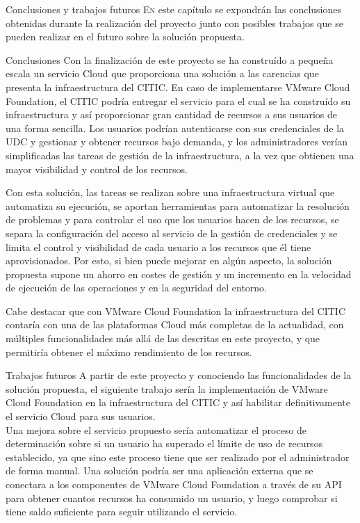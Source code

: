 \begin{chapter}{Conclusiones y trabajos futuros}
    \lettrine{E}{n} este capítulo se expondrán las conclusiones obtenidas durante la realización del proyecto junto con posibles trabajos que se pueden realizar en el futuro sobre la solución propuesta.
    
    \begin{section}{Conclusiones}
        Con la finalización de este proyecto se ha construído a pequeña escala un servicio Cloud que proporciona una solución a las carencias que presenta la infraestructura del CITIC. En caso de implementarse VMware Cloud Foundation, el CITIC podría entregar el servicio para el cual se ha construído su infraestructura y así proporcionar gran cantidad de recursos a sus usuarios de una forma sencilla. Los usuarios podrían autenticarse con sus credenciales de la UDC y gestionar y obtener recursos bajo demanda, y los administradores verían simplificadas las tareas de gestión de la infraestructura, a la vez que obtienen una mayor visibilidad y control de los recursos.

        Con esta solución, las tareas se realizan sobre una infraestructura virtual que automatiza su ejecución, se aportan herramientas para automatizar la resolución de problemas y para controlar el uso que los usuarios hacen de los recursos, se separa la configuración del acceso al servicio de la gestión de credenciales y se limita el control y visibilidad de cada usuario a los recursos que él tiene aprovisionados. Por esto, si bien puede mejorar en algún aspecto, la solución propuesta supone un ahorro en costes de gestión y un incremento en la velocidad de ejecución de las operaciones y en la seguridad del entorno.

        Cabe destacar que con VMware Cloud Foundation la infraestructura del CITIC contaría con una de las plataformas Cloud más completas de la actualidad, con múltiples funcionalidades más allá de las descritas en este proyecto, y que permitiría obtener el máximo rendimiento de los recursos.
    \end{section}
    \begin{section}{Trabajos futuros}
        A partir de este proyecto y conociendo las funcionalidades de la solución propuesta, el siguiente trabajo sería la implementación de VMware Cloud Foundation en la infraestructura del CITIC y así habilitar definitivamente el servicio Cloud para sus usuarios.
        \\
        Una mejora sobre el servicio propuesto sería automatizar el proceso de determinación sobre si un usuario ha superado el límite de uso de recursos establecido, ya que sino este proceso tiene que ser realizado por el administrador de forma manual. Una solución podría ser una aplicación externa que se conectara a los componentes de VMware Cloud Foundation a través de su API para obtener cuantos recursos ha consumido un usuario, y luego comprobar si tiene saldo suficiente para seguir utilizando el servicio.


\end{section}
\end{chapter}
